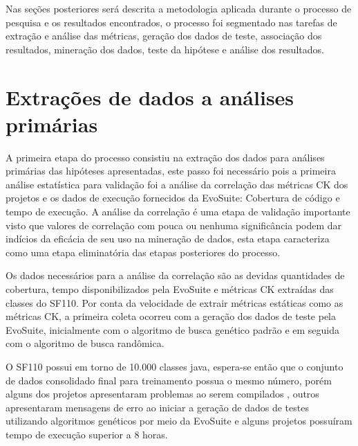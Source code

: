 \documentclass[
	12pt,				%
	oneside,			%
	a4paper,			%
	english,			%
	brazil				%
	]{abntex2ppgsi}
\begin{document}
Nas seções posteriores será descrita a metodologia aplicada durante o processo de pesquisa e os resultados encontrados, o processo foi segmentado nas tarefas de extração e análise das métricas, geração dos dados de teste, associação dos resultados, mineração dos dados, teste da hipótese e análise dos resultados.
 
  \section{Extrações de dados a análises primárias}
  A primeira etapa do processo consistiu na  extração dos dados para análises primárias das hipóteses apresentadas, este passo foi necessário pois a primeira análise estatística  para validação foi a análise da correlação das métricas CK dos projetos e os dados de execução fornecidos da EvoSuite: Cobertura de código e tempo de execução. A análise da correlação é uma etapa de validação importante visto que valores de correlação com pouca ou nenhuma significância podem dar indícios da eficácia de seu uso na mineração de dados, esta etapa caracteriza como uma etapa eliminatória das etapas posteriores do processo. 
  
 Os dados necessários para a análise da correlação são as devidas quantidades de cobertura, tempo disponibilizados pela EvoSuite e métricas CK extraídas das classes do SF110. Por conta da velocidade de extrair métricas estáticas como as métricas CK, a primeira coleta ocorreu com a geração dos dados de teste pela EvoSuite, inicialmente com o algoritmo de busca genético padrão e em seguida com o algoritmo de busca randômica.
 
 O SF110 possui em torno de 10.000 classes java, espera-se então que o conjunto de dados consolidado final para treinamento possua o mesmo número, porém alguns dos projetos apresentaram problemas ao serem compilados , outros apresentaram mensagens de erro ao iniciar a geração de dados de testes utilizando algoritmos genéticos por meio da EvoSuite e alguns projetos possuíram tempo de execução superior a 8 horas.
\end{document}
